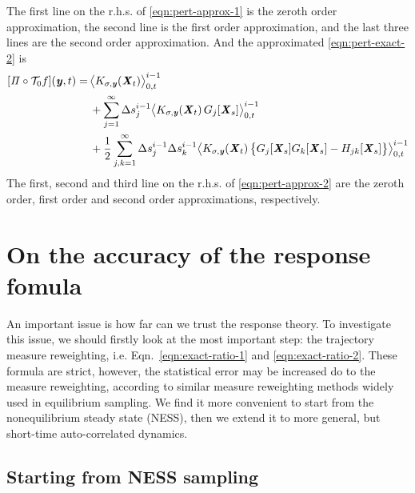 \documentclass[aip,jcp,a4paper,reprint,onecolumn]{revtex4-1}
\newcommand{\vect}[1]{\textbf{\textit{#1}}}
\newcommand{\mt}{\mathcal T}
\newcommand{\proj}{\mathit\Pi}
\begin{document}
The first line on the r.h.s. of \eqref{eqn:pert-approx-1}
is the zeroth order approximation,  the second line is the
first order approximation, and the last three lines are the
second order approximation.
And the approximated \eqref{eqn:pert-exact-2} is
\begin{align}
  \nonumber
  [\proj\circ\mt_0 f](\vect y, t)
  =&\,
  \big\langle
  K_{\sigma,\vect y}(\vect X_t)
  \big\rangle_{0,t}^{i-1}
  \\ \nonumber
  &\,+
  \sum_{j=1}^\infty
  \Delta s_j^{i-1}
  \big\langle
  K_{\sigma,\vect y}(\vect X_t)\,
  G_j[\vect X_s]
  \big\rangle_{0,t}^{i-1}
  \\\label{eqn:pert-approx-2}
  &\,
  +
  \frac 12
  \sum_{j,k=1}^\infty
  \Delta s_j^{i-1}\Delta s_k^{i-1}
  \big\langle
  K_{\sigma,\vect y}(\vect X_t)\,
  \big\{
  G_j[\vect X_s] G_k[\vect X_s] -
  H_{jk}[\vect X_s]
  \big\}
  \big\rangle_{0,t}^{i-1}  
\end{align}
The first, second and third line on the r.h.s. of \eqref{eqn:pert-approx-2}
are the zeroth order, first order and second order approximations, respectively.


\section{On the accuracy of the response fomula}

An important issue is how far can we trust the response theory.
To investigate this issue, we should firstly look at the
most important step: the trajectory measure reweighting,
i.e. Eqn.~\eqref{eqn:exact-ratio-1} and \eqref{eqn:exact-ratio-2}.
These formula are strict, however, the statistical error
may be increased do to the measure reweighting, according to
similar measure reweighting methods widely used in equilibrium sampling.
We find it more convenient to start from the nonequilibrium steady
state (NESS), then we extend it to more general, but short-time
auto-correlated dynamics.


\subsection{Starting from NESS sampling}
\end{document}
